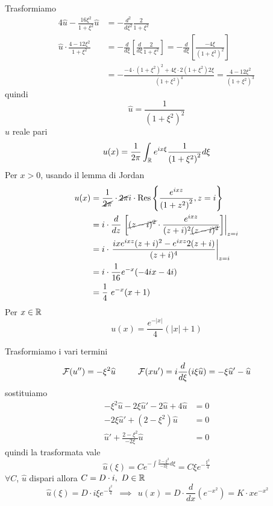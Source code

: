Trasformiamo
\begin{align*}
4\hat{u} - \frac{16\xi^{2}}{1 + \xi^{2}}\hat{u} & = - \frac{d^{2}}{d\xi^{2}}\frac{2}{1 + \xi^{2}}\\
\hat{u} \cdot \frac{4 - 12\xi^{2}}{1 + \xi^{2}} & = - \frac{d}{d\xi}\left[\frac{d}{d\xi}\frac{2}{1 + \xi^{2}}\right] = - \frac{d}{d\xi}\left[\frac{- 4\xi}{\left(1 + \xi^{2}\right)^{2}}\right]\\
 & = - \frac{- 4 \cdot \left(1 + \xi^{2}\right)^{2} + 4\xi \cdot 2\left(1 + \xi^{2}\right) 2\xi}{\left(1 + \xi^{2}\right)^{4}} = \frac{4 - 12\xi^{2}}{\left(1 + \xi^{2}\right)^{3}}
\end{align*}
quindi
\begin{equation*}
\hat{u} = \frac{1}{\left(1 + \xi^{2}\right)^{2}}
\end{equation*}
$\hat{u}$ reale pari
\begin{equation*}
u(x) = \frac{1}{2\pi}\int_{\mathbb{R}} e^{ix\xi}\frac{1}{\left(1 + \xi^{2}\right)^{2}} d\xi
\end{equation*}
Per $x > 0$, usando il lemma di Jordan
\begin{align*}
u(x) & = \frac{1}{\cancel{2\pi}} \cdot \cancel{2\pi} i \cdot \operatorname{Res} \left\{\frac{e^{ixz}}{\left(1 + z^{2}\right)^{2}}, z = i\right\}\\
 & = i \cdot \frac{d}{dz}\left. \left[\cancel{(z - i)^{2}} \cdot \frac{e^{ixz}}{(z + i)^{2}\cancel{(z - i)^{2}}}\right]\right|_{z = i}\\
 & = i \cdot \left. \frac{ixe^{ixz}(z + i)^{2} - e^{ixz} 2(z + i)}{(z + i)^{4}}\right|_{z = i}\\
 & = i \cdot \frac{1}{16} e^{- x}(- 4ix - 4i)\\
 & = \frac{1}{4} \ e^{- x}(x + 1)
\end{align*}
Per $x\in \mathbb{R} $
\begin{equation*}
u(x) = \frac{e^{- | x|}}{4}(| x| + 1)
\end{equation*}
\Soluzione

Trasformiamo i vari termini
\begin{equation*}
\mathcal{F} (u'') = - \xi^{2}\widehat{u} \ \ \ \ \ \ \ \ \mathcal{F} (xu') = i\frac{d}{d\xi}(i\xi \widehat{u}) = - \xi \widehat{u} ' - \widehat{u}
\end{equation*}
sostituiamo
\begin{align*}
- \xi^{2}\hat{u} - 2\xi \hat{u} ' - 2\hat{u} + 4\hat{u} & = 0\\
- 2\xi \hat{u} ' + \left(2 - \xi^{2}\right)\hat{u} & = 0\\
\hat{u} ' + \frac{2 - \xi^{2}}{- 2\xi}\hat{u} & = 0
\end{align*}
quindi la trasformata vale
\begin{equation*}
\hat{u}(\xi) = Ce^{- \int \frac{2 - \xi^{2}}{- 2\xi} d\xi} = C\xi e^{- \frac{\xi^{2}}{4}}
\end{equation*}
$\forall C$, $\hat{u}$ dispari allora $C = D \cdot i, \ D\in \mathbb{R} $
\begin{equation*}
\ \hat{u}(\xi) = D \cdot i\xi e^{- \frac{\xi^{2}}{4}} \ \ \implies \ \ u(x) = D \cdot \frac{d}{dx}\left(e^{- x^{2}}\right) = K \cdot xe^{- x^{2}}
\end{equation*}
